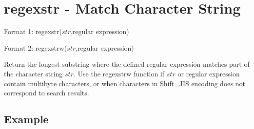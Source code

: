 
%

\section{regexstr - Match Character String\label{sect:regexstr}}

Format 1: regexstr($str$,regular expression)

Format 2: regexstrw($str$,regular expression)

Return the longest substring where the defined regular expression matches part of the character string $str$. Use the regexstrw function if $str$ or regular expression contain multibyte characters, or when characters in Shift\_JIS encoding does not correspond to search results. 

\subsection*{Example}


%

